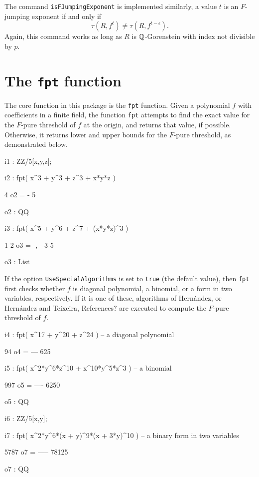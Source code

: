 \documentclass{amsart}
\begin{document}
The command {\tt isFJumpingExponent} is implemented similarly, a value $t$ is an $F$-jumping exponent if and only if
\[
\tau(R, f^t) \neq \tau(R, f^{t-\epsilon}).  
\]
Again, this command works as long as $R$ is $\mathbb{Q}$-Gorenstein with index not divisible by $p$. 


\newpage
\section{The {\tt fpt} function}
\label{sec.FPT}

The core function in this package is the {\tt fpt} function.  Given a polynomial $f$ with coefficients in a finite field, the function {\tt fpt} attempts to find the exact value for the $F$-pure threshold of $f$ at the origin, and returns that value, if possible.  Otherwise, it returns lower and upper bounds for the $F$-pure threshold, as demonstrated below.
     
\medskip
{\small
{}
\begin{MyVerbatim}
i1 : ZZ/5[x,y,z];

i2 : fpt( x^3 + y^3 + z^3 + x*y*z )

     4
o2 = -
     5

o2 : QQ

i3 : fpt( x^5 + y^6 + z^7 + (x*y*z)^3 )

      1  2
o3 = {-, -}
      3  5

o3 : List
\end{MyVerbatim}
}
            
             If the option {\tt UseSpecialAlgorithms} is set to {\tt true} (the default value), then {\tt fpt} first checks whether $f$ is diagonal polynomial, a binomial, or a form in two variables, respectively.
             If it is one of these, algorithms of Hern\'andez, or Hern\'andez and Teixeira, {\color{red}  References?} are executed to compute the $F$-pure threshold of $f$.

\medskip
{\small
{}
\begin{MyVerbatim}
i4 : fpt( x^17 + y^20 + z^24 ) -- a diagonal polynomial

      94
o4 = ---
     625
     
i5 : fpt( x^2*y^6*z^10 + x^10*y^5*z^3 ) -- a binomial

      997
o5 = ----
     6250

o5 : QQ     

i6 : ZZ/5[x,y];

i7 : fpt( x^2*y^6*(x + y)^9*(x + 3*y)^10 ) -- a binary form in two variables

      5787
o7 = -----
     78125

o7 : QQ
\end{MyVerbatim}
}
       
\end{document}
